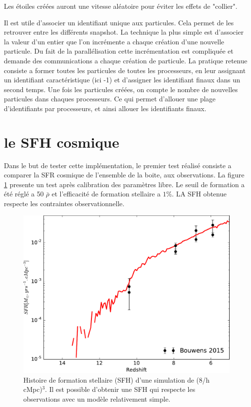 Les étoiles créées auront une vitesse aléatoire pour éviter les effets de "collier".


Il est utile d'associer un identifiant unique aux particules.
Cela permet de les retrouver entre les différents snapshot.
La technique la plus simple est d'associer la valeur d'un entier que l'on incrémente a chaque création d'une nouvelle particule.
Du fait de la parallélisation cette incrémentation est compliquée et demande des communications a chaque création de particule.
La pratique retenue consiste a former toutes les particules de toutes les processeurs, en leur assignant un identifiant caractéristique (ici -1) et d'assigner les identifiant finaux dans un second temps.
Une fois les particules créées,  on compte le nombre de nouvelles particules dans chaques processeurs.
Ce qui permet d'allouer une plage d'identifiants par processeurs, et ainsi allouer les identifiants finaux.


\section{le SFH cosmique}

Dans le but de tester cette implémentation, le premier test réalisé consiste a comparer la SFR cosmique de l'ensemble de la boite, aux observations.
La figure \ref{fig:test_SFH} presente un test après calibration des paramètres libre.
Le seuil de formation a été réglé a 50 $\bar{\rho}$ et l'efficacité de formation stellaire a $1\%$.
LA SFH obtenue respecte les contraintes observationnelle.


\begin{figure}[bth]
        \includegraphics[width=.95\linewidth]{img/02/SFR.pdf}
        \caption{Histoire de formation stellaire (SFH) d'une simulation de (8/h cMpc)$^3$.
        Il est possible d'obtenir une SFH qui respecte les observations avec un modèle relativement simple.
}
 		\label{fig:test_SFH}
\end{figure}

